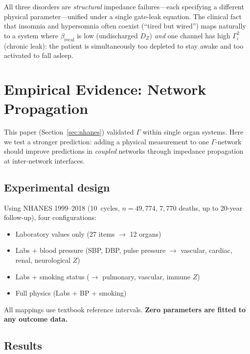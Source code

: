 \documentclass[aps,pre,twocolumn,superscriptaddress,floatfix]{revtex4-2}
\begin{document}
\noindent
All three disorders are \emph{structural} impedance
failures---each specifying a different physical
parameter---unified under a single gate-leak equation.
The clinical fact that insomnia and hypersomnia
often coexist (``tired but wired'') maps naturally
to a system where $\beta_{\text{recal}}$ is low
(undischarged $D_Z$) \emph{and} one channel has
high $\Gamma_i^2$ (chronic leak):
the patient is simultaneously too depleted to stay
awake and too activated to fall asleep.


\section{Empirical Evidence: Network Propagation}
\label{sec:propagation}

This paper (Section~\ref{sec:nhanes}) validated $\Gamma$
within single organ systems.
Here we test a stronger prediction: adding a physical
measurement to one $\Gamma$-network should improve
predictions in \emph{coupled} networks through
impedance propagation at inter-network interfaces.

\subsection{Experimental design}

Using NHANES 1999--2018 (10~cycles, $n = 49{,}774$,
$7{,}770$ deaths, up to 20-year follow-up), four
configurations:
\begin{itemize}
  \item[A] Laboratory values only (27 items $\to$ 12 organs)
  \item[B] Labs + blood pressure (SBP, DBP, pulse pressure
    $\to$ vascular, cardiac, renal, neurological $Z$)
  \item[C] Labs + smoking status
    ($\to$ pulmonary, vascular, immune $Z$)
  \item[D] Full physics (Labs + BP + smoking)
\end{itemize}
All mappings use textbook reference intervals.
\textbf{Zero parameters are fitted to any outcome data.}

\subsection{Results}
\end{document}
